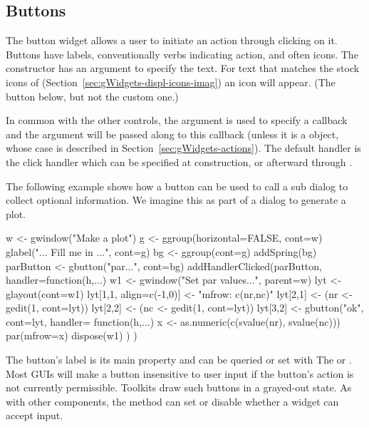 \subsection{Buttons}
\label{sec:gWidgets-buttons}

The button widget allows a user to initiate an action through clicking
on it. Buttons have labels, conventionally verbs indicating action,
and often icons. The  constructor has an argument
 to specify the text.  For text that matches
the stock icons of 
(Section~\ref{sec:gWidgets-displ-icons-imag}) an icon will
appear. (The  button below, but not the custom  one.)

In common with the other controls, the argument
 is used to specify a callback and the
 argument will be passed along to this
callback (unless it is a  object, whose case is described
in Section~\ref{sec:gWidgets-actions}).
The default handler is the click handler which can be specified at
construction, or afterward through 
.

The following example shows how a button can be used to call a sub
dialog to collect optional information. We imagine this as part of a
dialog to generate a plot.

\begin{Schunk}
\begin{Sinput}
 w <- gwindow("Make a plot")
 g <- ggroup(horizontal=FALSE, cont=w)
 glabel("... Fill me in ...", cont=g)
 bg <- ggroup(cont=g)
 addSpring(bg)
 parButton <- gbutton("par...", cont=bg)
 addHandlerClicked(parButton, handler=function(h,...) {
   w1 <- gwindow("Set par values...", parent=w)
   lyt <- glayout(cont=w1)
   lyt[1,1, align=c(-1,0)] <- "mfrow: c(nr,nc)"
   lyt[2,1] <- (nr <- gedit(1, cont=lyt))
   lyt[2,2] <- (nc <- gedit(1, cont=lyt))
   lyt[3,2] <- gbutton("ok", cont=lyt, handler=
                       function(h,...) {
                         x <- as.numeric(c(svalue(nr), svalue(nc)))
                         par(mfrow=x)
                         dispose(w1)
                       })
 })
\end{Sinput}
\end{Schunk}



The button's label is its main property and can be queried or set with
The  or .  Most
GUIs will make a button insensitive to user input if the button's
action is not currently permissible. Toolkits draw such buttons in a
grayed-out state. As with other components, the  method can set
or disable whether a widget can accept input.

